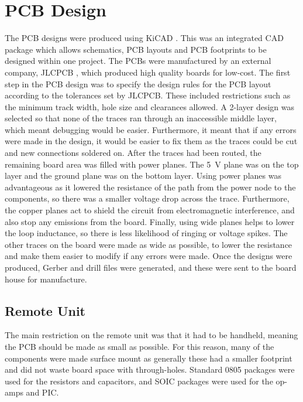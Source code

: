 \section{PCB Design}
The PCB designs were produced using KiCAD \cite{kicad}. This was an integrated CAD package which allows schematics, PCB layouts and PCB footprints to be designed within one project. The PCBs were manufactured by an external company, JLCPCB \cite{pcb_house}, which produced high quality boards for low-cost. The first step in the PCB design was to specify the design rules for the PCB layout according to the tolerances set by JLCPCB. These included restrictions such as the minimum track width, hole size and clearances allowed. A 2-layer design was selected so that none of the traces ran through an inaccessible middle layer, which meant debugging would be easier. Furthermore, it meant that if any errors were made in the design, it would be easier to fix them as the traces could be cut and new connections soldered on. After the traces had been routed, the remaining board area was filled with power planes. The \SI{+5}{\volt} plane was on the top layer and the ground plane was on the bottom layer. Using power planes was advantageous as it lowered the resistance of the path from the power node to the components, so there was a smaller voltage drop across the trace. Furthermore, the copper planes act to shield the circuit from electromagnetic interference, and also stop any emissions from the board. Finally, using wide planes helps to lower the loop inductance, so there is less likelihood of ringing or voltage spikes. The other traces on the board were made as wide as possible, to lower the resistance and make them easier to modify if any errors were made. Once the designs were produced, Gerber and drill files were generated, and these were sent to the board house for manufacture.\\


\subsection{Remote Unit}
The main restriction on the remote unit was that it had to be handheld, meaning the PCB should be made as small as possible. For this reason, many of the components were made surface mount as generally these had a smaller footprint and did not waste board space with through-holes. Standard 0805 packages were used for the resistors and capacitors, and SOIC packages were used for the op-amps and PIC.\\

